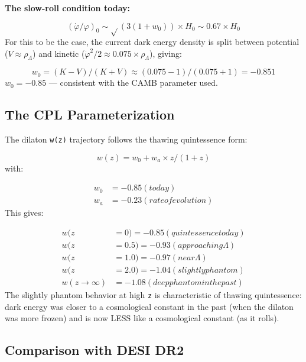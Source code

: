 \documentclass[aps,prd,preprint,superscriptaddress,longbibliography]{revtex4-2}
\begin{document}
\textbf{The slow-roll condition today:}


\begin{equation}
    (\dot{\varphi} / \varphi)_{0} \sim  \sqrt{}(3(1+w_{0})) \times H_{0} \sim  0.67 \times H_{0}
\end{equation}
For this to be the case, the current dark energy density is split between potential ($V \approx \rho_\Lambda$) and kinetic ($\dot{\varphi}^{2}/2 \approx 0.075 \times \rho_\Lambda$), giving:


\begin{equation}
    w_{0} = (K - V)/(K + V) \approx (0.075 - 1)/(0.075 + 1) = -0.851
\end{equation}
\textbf{$w_{0} = -0.85$} --- consistent with the CAMB parameter used.



\subsection{The CPL Parameterization}

The dilaton \texttt{w(z)} trajectory follows the \cite{CaldwellLinder2005} thawing quintessence form:


\begin{equation}
    w(z) = w_{0} + w_a \times z/(1+z)
\end{equation}
with:

\begin{align}
    w_{0} &= -0.85    (today) \\
    w_a &= -0.23   (rate of evolution)
\end{align}
This gives:

\begin{align}
    w(z &= 0) = -0.85    (quintessence today) \\
    w(z &= 0.5) = -0.93  (approaching \Lambda) \\
    w(z &= 1.0) = -0.97  (near \Lambda) \\
    w(z &= 2.0) = -1.04  (slightly phantom) \\
    w(z\to\infty) &= -1.08   (deep phantom in the past)
\end{align}
The slightly phantom behavior at high \texttt{z} is characteristic of thawing quintessence: dark energy was closer to a cosmological constant in the past (when the dilaton was more frozen) and is now LESS like a cosmological constant (as it rolls).



\subsection{Comparison with DESI DR2}
\end{document}
